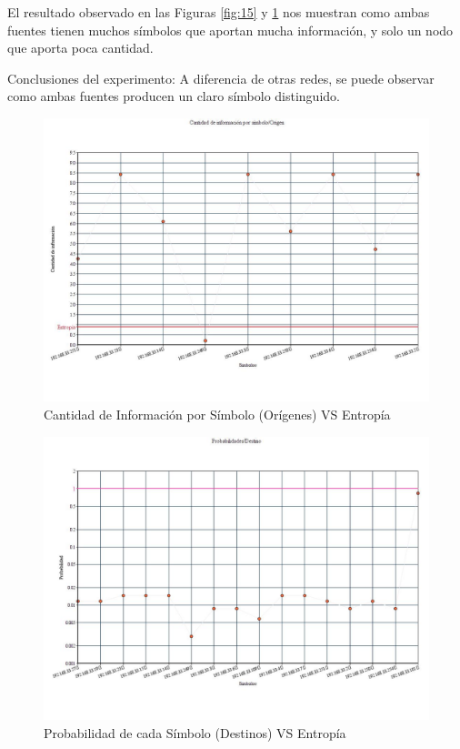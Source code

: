 El resultado observado en las Figuras \ref{fig:15} y \ref{fig:16} nos muestran como ambas fuentes tienen muchos símbolos que aportan mucha información, y solo un nodo que aporta poca cantidad.

Conclusiones del experimento: A diferencia de otras redes, se puede observar como ambas fuentes producen un claro símbolo distinguido.

\begin{figure}[H]
  \centering
    \includegraphics[scale=0.45]{imagenes/graficos/entropiaCantInf/06Origen.jpg}
  \caption{Cantidad de Información por Símbolo (Orígenes) VS Entropía}
  \label{fig:16}
\end{figure}

\begin{figure}[H]
  \centering
    \includegraphics[scale=0.45]{imagenes/graficos/Probabilidades/06destino.jpg}
  \caption{Probabilidad de cada Símbolo (Destinos) VS Entropía}
  \label{fig:17}
\end{figure}

